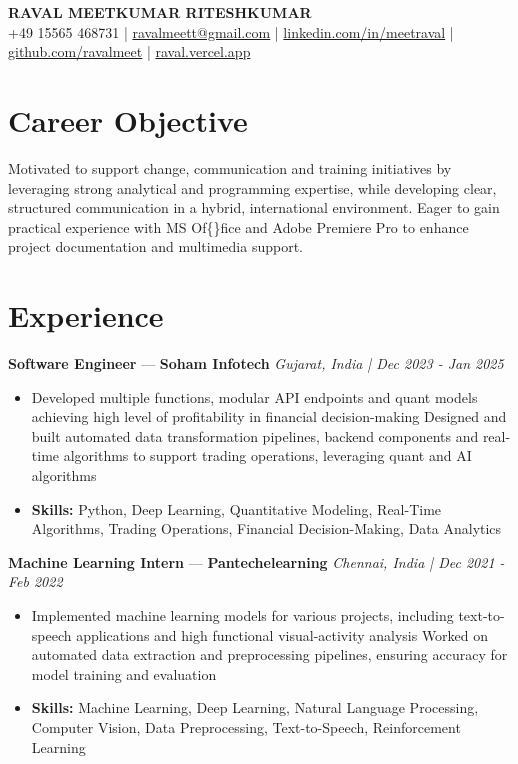 \documentclass[a4paper,10pt]{article}
\begin{document}
\begin{center}
  {\Large\bfseries RAVAL MEETKUMAR RITESHKUMAR}\\[2pt]
  {\small +49 15565 468731 \;|\; \href{mailto:ravalmeett@gmail.com}{ravalmeett@gmail.com} \;|\; \href{https://www.linkedin.com/in/meetraval/}{linkedin.com/in/meetraval} \;|\; \href{https://github.com/ravalmeet}{github.com/ravalmeet} \;|\; \href{https://raval.vercel.app/}{raval.vercel.app}}
\end{center}
\vspace{-3pt}

\section*{Career Objective}
Motivated to support change, communication and training initiatives by leveraging strong analytical and programming expertise, while developing clear, structured communication in a hybrid, international environment. Eager to gain practical experience with MS Of\{\}fice and Adobe Premiere Pro to enhance project documentation and multimedia support.\par

\section*{Experience}
\textbf{Software Engineer} — \textbf{Soham Infotech} \hfill \textit{Gujarat, India \;|\; Dec 2023 - Jan 2025}\par
\vspace{1pt}
\begin{itemize}
  \item Developed multiple functions, modular API endpoints and quant models achieving high level of profitability in financial decision-making Designed and built automated data transformation pipelines, backend components and real-time algorithms to support trading operations, leveraging quant and AI algorithms
  \item \textbf{Skills:} Python, Deep Learning, Quantitative Modeling, Real-Time Algorithms, Trading Operations, Financial Decision-Making, Data Analytics
\end{itemize}
\vspace{3pt}
\textbf{Machine Learning Intern} — \textbf{Pantechelearning} \hfill \textit{Chennai, India \;|\; Dec 2021 - Feb 2022}\par
\vspace{1pt}
\begin{itemize}
  \item Implemented machine learning models for various projects, including text-to-speech applications and high functional visual-activity analysis Worked on automated data extraction and preprocessing pipelines, ensuring accuracy for model training and evaluation
  \item \textbf{Skills:} Machine Learning, Deep Learning, Natural Language Processing, Computer Vision, Data Preprocessing, Text-to-Speech, Reinforcement Learning
\end{itemize}
\end{document}

